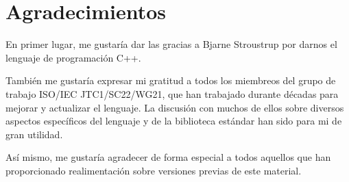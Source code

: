 \chapter*{Agradecimientos}

En primer lugar, me gustaría dar las gracias a Bjarne Stroustrup
por darnos el lenguaje de programación C++.

También me gustaría expresar mi gratitud a todos los miembreos del
grupo de trabajo ISO/IEC JTC1/SC22/WG21, que han trabajado durante
décadas para mejorar y actualizar el lenguaje.
La discusión con muchos de ellos sobre diversos aspectos específicos
del lenguaje y de la biblioteca estándar han sido para mi de gran utilidad.

Así mismo, me gustaría agradecer de forma especial a todos aquellos
que han proporcionado realimentación sobre versiones previas de este 
material.

